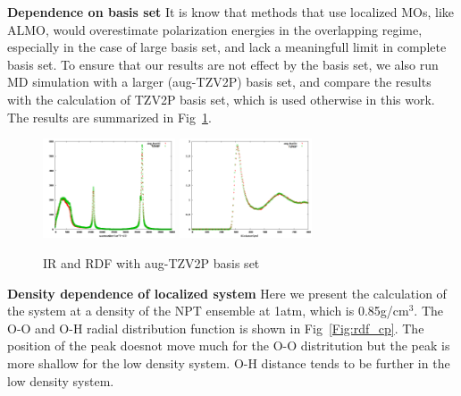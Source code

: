 \documentclass[prl,twocolumn,showpacs]{revtex4}
\begin{document}
\textbf{Dependence on basis set} It is know that methods that use localized MOs, like ALMO, would overestimate polarization energies in the overlapping regime, especially in the case of large basis set, and lack a meaningfull limit in complete basis set\cite{horn2015polarization}. To ensure that our results are not effect by the basis set, we also run MD simulation with a larger (aug-TZV2P) basis set, and compare the results with the calculation of TZV2P basis set, which is used otherwise in this work. The results are summarized in Fig~\ref{Fig:basis}.

\begin{figure}
\includegraphics[width=0.35\textwidth]{aug_ir}
\includegraphics[width=0.35\textwidth]{aug_rdf}
\caption{IR and RDF with aug-TZV2P basis set}\label{Fig:basis}
\end{figure} 

\textbf{Density dependence of localized system} Here we present the calculation of the system at a density of the NPT ensemble at 1atm, which is 0.85g/cm$^3$. The O-O and O-H radial distribution function is shown in Fig~\ref{Fig:rdf_cp}. The position of the peak doesnot move much for the O-O distritution but the peak is more shallow for the low density system. O-H distance tends to be further in the low density system.
\end{document}

